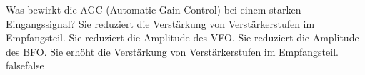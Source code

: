     {Was bewirkt die AGC (Automatic Gain Control) bei einem starken Eingangssignal?}
    {Sie reduziert die Verstärkung von Verstärkerstufen im Empfangsteil.}
    {Sie reduziert die Amplitude des VFO.}
    {Sie reduziert die Amplitude des BFO.}
    {Sie erhöht die Verstärkung von Verstärkerstufen im Empfangsteil.}
    {false}{false}